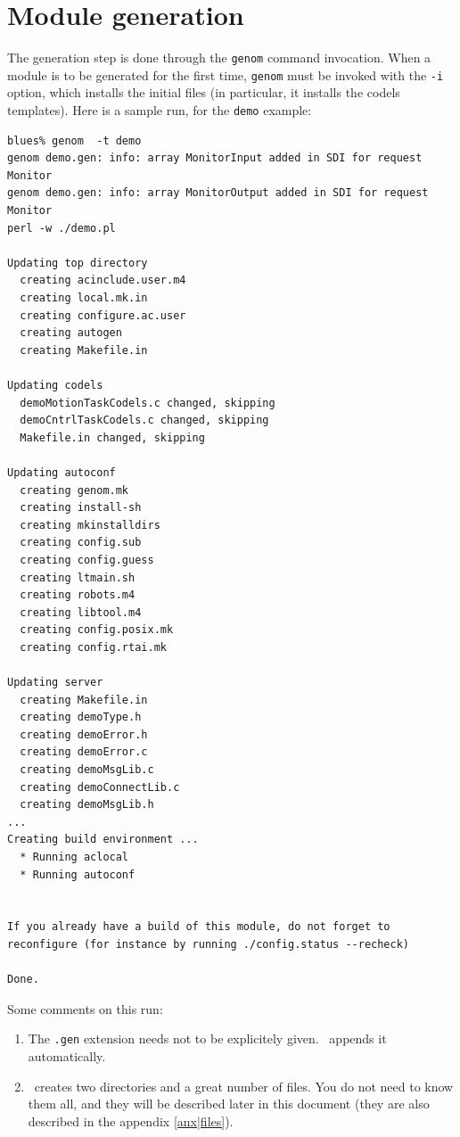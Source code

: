 \section{Module generation}
\label{sec|session|generate}

The  generation step is done  through the {\tt genom} command invocation.
When a module is to be generated for the  first time, {\tt genom} must be
invoked  with the {\tt  -i} option, which installs  the initial files (in
particular, it installs the codels templates).  Here is a sample run, for
the {\tt demo} example:

\begin{center}
\begin{cartouche}\small
\begin{verbatim}
blues% genom  -t demo
genom demo.gen: info: array MonitorInput added in SDI for request Monitor
genom demo.gen: info: array MonitorOutput added in SDI for request Monitor
perl -w ./demo.pl

Updating top directory
  creating acinclude.user.m4
  creating local.mk.in
  creating configure.ac.user
  creating autogen
  creating Makefile.in

Updating codels
  demoMotionTaskCodels.c changed, skipping
  demoCntrlTaskCodels.c changed, skipping
  Makefile.in changed, skipping

Updating autoconf
  creating genom.mk
  creating install-sh
  creating mkinstalldirs
  creating config.sub
  creating config.guess
  creating ltmain.sh
  creating robots.m4
  creating libtool.m4
  creating config.posix.mk
  creating config.rtai.mk

Updating server
  creating Makefile.in
  creating demoType.h
  creating demoError.h
  creating demoError.c
  creating demoMsgLib.c
  creating demoConnectLib.c
  creating demoMsgLib.h
...
Creating build environment ...
  * Running aclocal
  * Running autoconf


If you already have a build of this module, do not forget to
reconfigure (for instance by running ./config.status --recheck)

Done.

\end{verbatim}
\end{cartouche}
\end{center}

\bigbreak

Some comments on this run:

\begin{enumerate}
   \item  The {\tt   .gen}  extension   needs   not  to be    explicitely
   given. \GenoM\ appends it automatically.


   \item \GenoM\ creates two directories and a great number of files. You
   do not need to know them all, and they will be described later in this
   document (they are also described in the appendix \ref{anx|files}).
\end{enumerate}

